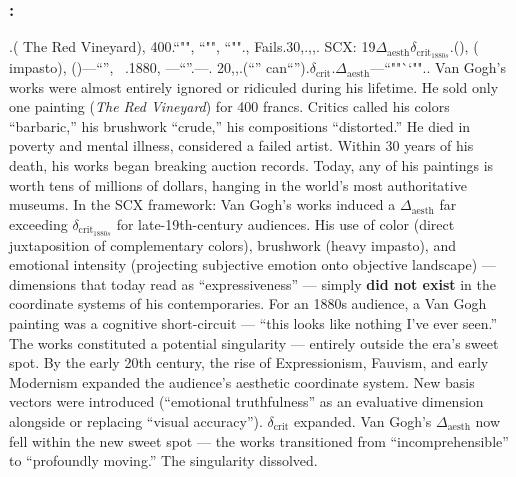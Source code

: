 \documentclass[12pt,a4paper]{article}
\theoremstyle{remark}
\newcommand{\AesthDelta}{\Delta_{\text{aesth}}}
\newcommand{\CritDelta}{\delta_{\text{crit}}}
\begin{document}
\subsubsection{:}
.({\kaishu} The Red Vineyard), 400.``"", ``"", ``""., Fails.30,.,,.
SCX: 19$\AesthDelta$$\CritDelta_{1880s}$.(), ({\kaishu} impasto), ()---``'', \ .1880, ---``''.---.
20,,.(``'' can``'').$\CritDelta$.$\AesthDelta$---``""``""..
Van Gogh's works were almost entirely ignored or ridiculed during his lifetime. He sold only one painting (\textit{The Red Vineyard}) for 400 francs. Critics called his colors ``barbaric,'' his brushwork ``crude,'' his compositions ``distorted.'' He died in poverty and mental illness, considered a failed artist. Within 30 years of his death, his works began breaking auction records. Today, any of his paintings is worth tens of millions of dollars, hanging in the world's most authoritative museums.
In the SCX framework: Van Gogh's works induced a $\AesthDelta$ far exceeding $\CritDelta_{1880s}$ for late-19th-century audiences. His use of color (direct juxtaposition of complementary colors), brushwork (heavy impasto), and emotional intensity (projecting subjective emotion onto objective landscape) --- dimensions that today read as ``expressiveness'' --- simply \textbf{did not exist} in the coordinate systems of his contemporaries. For an 1880s audience, a Van Gogh painting was a cognitive short-circuit --- ``this looks like nothing I've ever seen.'' The works constituted a potential singularity --- entirely outside the era's sweet spot.
By the early 20th century, the rise of Expressionism, Fauvism, and early Modernism expanded the audience's aesthetic coordinate system. New basis vectors were introduced (``emotional truthfulness'' as an evaluative dimension alongside or replacing ``visual accuracy''). $\CritDelta$ expanded. Van Gogh's $\AesthDelta$ now fell within the new sweet spot --- the works transitioned from ``incomprehensible'' to ``profoundly moving.'' The singularity dissolved.
\end{document}
